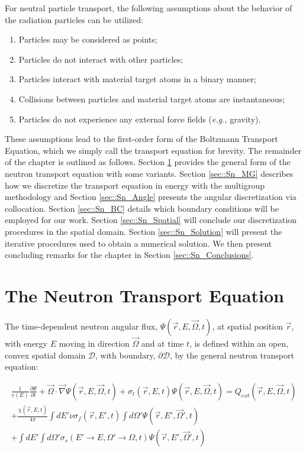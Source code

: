 For neutral particle transport, the following assumptions \cite{duderstadt1979transport} about the behavior of the radiation particles can be utilized:

\begin{enumerate}
	\item Particles may be considered as points;
	\item Particles do not interact with other particles;
	\item Particles interact with material target atoms in a binary manner;
	\item Collisions between particles and material target atoms are instantaneous;
	\item Particles do not experience any external force fields ({\em e.g.,} gravity).
\end{enumerate}

These assumptions lead to the first-order form of the Boltzmann Transport Equation, which we simply call the transport equation for brevity. The remainder of the chapter is outlined as follows. Section \ref{sec::Sn_neut} provides the general form of the neutron transport equation with some variants. Section \ref{sec::Sn_MG} describes how we discretize the transport equation in energy with the multigroup methodology and Section \ref{sec::Sn_Angle} presents the angular discretization via collocation. Section \ref{sec::Sn_BC} details which boundary conditions will be employed for our work. Section \ref{sec::Sn_Spatial} will conclude our discretization procedures in the spatial domain. Section \ref{sec::Sn_Solution} will present the iterative procedures used to obtain a numerical solution. We then present concluding remarks for the chapter in Section \ref{sec::Sn_Conclusions}.

\section{The Neutron Transport Equation}
\label{sec::Sn_neut}

The time-dependent neutron angular flux, $\Psi (\vec{r}, E, \vec{\Omega}, t)$, at spatial position $\vec{r}$, with energy $E$ moving in direction $\vec{\Omega}$ and at time $t$, is defined within an open, convex spatial domain $\mathcal{D}$, with boundary, $\partial \mathcal{D}$, by the general neutron transport equation:


\begin{equation}
\label{eq::Sn_transport_eq_full}
\begin{aligned}
\frac{1}{v(E)}\frac{\partial \Psi}{\partial t} + \vec{\Omega} \cdot \vec{\nabla} \Psi (\vec{r}, E, \vec{\Omega},t)+ \sigma_t (\vec{r}, E,t) \Psi (\vec{r}, E, \vec{\Omega},t) =Q_{ext} (\vec{r}, E, \vec{\Omega},t) \\
+ \frac{\chi (\vec{r}, E,t)}{4 \pi} \int dE' \nu \sigma_f (\vec{r}, E',t) \int d\Omega' \Psi (\vec{r}, E', \vec{\Omega}',t) \\ 
+ \int dE' \int d\Omega' \sigma_s (E' \rightarrow E, \Omega' \rightarrow \Omega,t) \Psi (\vec{r}, E', \vec{\Omega}',t)
\end{aligned}
\end{equation}

